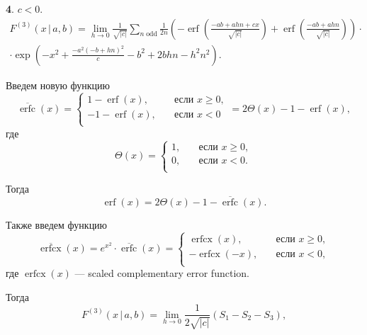 \documentclass[12pt]{article}
\def\FW{F^{(3)}}
\begin{document}
{\bf 4}. $c < 0$.
\begin{multline}
    \FW(x \, | \, a, b) = \lim_{h\rightarrow0} \frac{1}{\sqrt{|c|}} \sum\limits_{n \; \text{odd}} \frac{1}{2n} \left(- \operatorname{erf}{\left(\frac{- a b + a h n + c x}{\sqrt{|c|}} \right)} + \operatorname{erf}{\left(\frac{-ab + ahn}{\sqrt{|c|}} \right)}\right) \cdot\\\cdot\exp\left(- x^{2} + \frac{- a^{2} \left(- b + h n\right)^{2}}{c} - b^{2} + 2 b h n - h^{2} n^{2}\right).
\end{multline}

Введем новую функцию
\begin{equation}
    \overline{\operatorname{erfc}}(x) = 
    \begin{cases}
        1 - \operatorname{erf}(x), \quad &\text{если $x \ge 0$}, \\
        -1 - \operatorname{erf}(x), \quad &\text{если $x < 0$} \\
    \end{cases}
    = 2\Theta(x) - 1 - \operatorname{erf}(x),
\end{equation}
где
\begin{equation}
    \Theta(x) = 
    \begin{cases}
        1,  \quad &\text{если $x \ge 0$}, \\
        0, \quad &\text{если $x < 0$}. \\
    \end{cases}    
\end{equation}

Тогда
\begin{equation}
    \operatorname{erf}(x) = 2\Theta(x) - 1 - \overline{\operatorname{erfc}}(x).
\end{equation}

Также введем функцию
\begin{equation}
    \overline{\operatorname{erfcx}}(x) = e^{x^2}\cdot\overline{\operatorname{erfc}}(x) = 
    \begin{cases}
        \operatorname{erfcx}(x), \quad &\text{если $x \ge 0$}, \\
        -\operatorname{erfcx}(-x), \quad &\text{если $x < 0$}, \\
    \end{cases}
\end{equation}
где $\operatorname{erfcx}(x)$ --- scaled complementary error function.

Тогда
\begin{equation}
    \FW(x \, | \, a, b) = \lim_{h\rightarrow0} \frac{1}{2\sqrt{|c|}} \left(S_1 - S_2 - S_3\right),
\end{equation}
\end{document}
